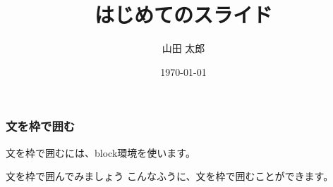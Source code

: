 \documentclass{beamer}
\title{はじめてのスライド}
\author{山田 太郎}
\institute{羅手府大学}
\date{\today}
\begin{document}
\maketitle
\begin{frame}
\frametitle{文を枠で囲む}
文を枠で囲むには、block環境を使います。
\begin{block}{文を枠で囲んでみましょう}
こんなふうに、文を枠で囲むことができます。
\end{block}
\end{frame}
\end{document}
